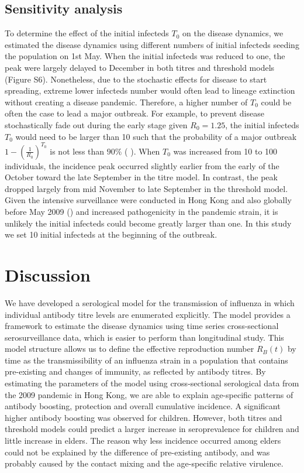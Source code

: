\documentclass{article}
\begin{document}
\subsection{Sensitivity analysis}
To determine the effect of the initial infecteds $T_{0}$ on the disease dynamics, we estimated the disease dynamics using different numbers of initial infecteds seeding the population on 1st May. When the initial infecteds was reduced to one, the peak were largely delayed to December in both titres and threshold models (Figure S6). Nonetheless, due to the stochastic effects for disease to start spreading, extreme lower infecteds number would often lead to lineage extinction without creating a disease pandemic. Therefore, a higher number of $T_{0}$ could be often the case to lead a major outbreak. For example, to prevent disease stochastically fade out during the early stage given $R_{0}=1.25$, the initial infecteds $T_{0}$ would need to be larger than 10 such that the probability of a major outbreak $1-{(\frac{1}{R_{0}})}^{T_{0}}$ is not less than $90\%$ (\cite{Allen2012} \cite{Hartfield2013}). When $T_{0}$ was increased from 10 to 100 individuals, the incidence peak occurred slightly earlier from the early of the October toward the late September in the titre model. In contrast, the peak dropped largely from mid November to late September in the threshold model. Given the intensive surveillance were conducted in Hong Kong and also globally before May 2009 (\cite{Fielding2010}) and increased pathogenicity in the pandemic strain, it is unlikely the initial infecteds could become greatly larger than one. In this study we set 10 initial infecteds at the beginning of the outbreak. 


\section{Discussion}
We have developed a serological model for the transmission of influenza in which individual antibody titre levels are enumerated explicitly. The model provides a framework to estimate the disease dynamics using time series cross-sectional serosurveillance data, which is easier to perform than longitudinal study. This model structure allows us to define the effective reproduction number $R_{B}(t)$ by time as the transmissibility of an influenza strain in a population that contains pre-existing and changes of immunity, as reflected by antibody titres. By estimating the parameters of the model using cross-sectional serological data from the 2009 pandemic in Hong Kong, we are able to explain age-specific patterns of antibody boosting, protection and overall cumulative incidence. A significant higher antibody boosting was observed for children. However, both titres and threshold models could predict a larger increase in seroprevalence for children and little increase in elders. The reason why less incidence occurred among elders could not be explained by the difference of pre-existing antibody, and was probably caused by the contact mixing and the age-specific relative virulence.   
  
\end{document}
